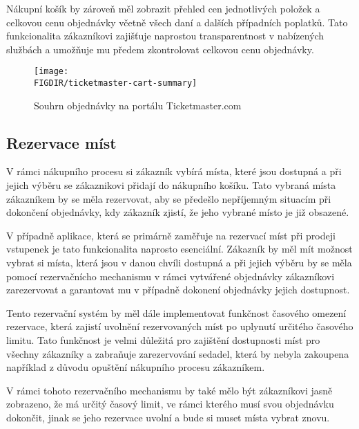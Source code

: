 Nákupní košík by zároveň měl zobrazit přehled cen jednotlivých položek a celkovou cenu objednávky včetně všech daní a dalších případních poplatků.
Tato funkcionalita zákazníkovi zajišťuje naprostou transparentnost v nabízených službách a umožňuje mu předem zkontrolovat celkovou cenu objednávky.

\begin{figure}[H]
    \texttt{[image: \\FIGDIR/ticketmaster-cart-summary]}
    \centering
    \caption{Souhrn objednávky na portálu Ticketmaster.com}
    \label{fig:ticketmaster-cart-summary}
\end{figure}


\subsection{Rezervace míst}
\label{subsec:specifikace-nakupni-kosik-rezervace}
V rámci nákupního procesu si zákazník vybírá místa, které jsou dostupná a při jejich výběru se zákaznikovi přidají do nákupního košíku.
Tato vybraná místa zákazníkem by se měla rezervovat, aby se předešlo nepříjemným situacím při dokončení objednávky, kdy zákazník zjistí, že jeho vybrané místo je již obsazené.

V případně aplikace, která se primárně zaměřuje na rezervací míst při prodeji vstupenek je tato funkcionalita naprosto esenciální.
Zákazník by měl mít možnost vybrat si místa, která jsou v danou chvíli dostupná a při jejich výběru by se měla pomocí rezervačnícho mechanismu v rámci vytvářené objednávky zákazníkovi zarezervovat a garantovat mu v případně dokonení objednávky jejich dostupnost.

Tento rezervační systém by měl dále implementovat funkčnost časového omezení rezervace, která zajistí uvolnění rezervovaných míst po uplynutí určitého časového limitu.
Tato funkčnost je velmi důležitá pro zajištění dostupnosti míst pro všechny zákazníky a zabraňuje zarezervování sedadel, která by nebyla zakoupena například z důvodu opuštění nákupního procesu zákazníkem.

V rámci tohoto rezervačního mechanismu by také mělo být zákazníkovi jasně zobrazeno, že má určitý časový limit, ve rámci kterého musí svou objednávku dokončit, jinak se jeho rezervace uvolní a bude si muset místa vybrat znovu.

